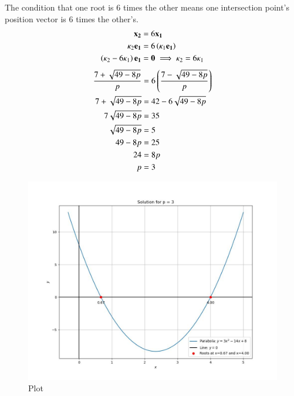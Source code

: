 \documentclass[journal]{IEEEtran}
\begin{document}
The condition that one root is 6 times the other means one intersection point's position vector is 6 times the other's.
\begin{align}
    \mathbf{x_2} &= 6\mathbf{x_1} \\
    \kappa_2\mathbf{e_1} &= 6\left(\kappa_1\mathbf{e_1}\right) \\
    \left(\kappa_2 - 6\kappa_1\right)\mathbf{e_1} &= \mathbf{0} \implies \kappa_2 = 6\kappa_1
\end{align}
\begin{align}
    \frac{7 + \sqrt{49-8p}}{p} &= 6\left(\frac{7 - \sqrt{49-8p}}{p}\right) \\
    7 + \sqrt{49-8p} &= 42 - 6\sqrt{49-8p} \\
    7\sqrt{49-8p} &= 35 \\
    \sqrt{49-8p} &= 5 \\
    49-8p &= 25 \\
    24 &= 8p \\
    p &= 3
\end{align}

\begin{figure}[h!]
	\centering
	\includegraphics[width=\columnwidth]{figs/plot_c.jpg}
	\caption*{Plot}
	\label{fig:fig}
\end{figure}
\end{document}
